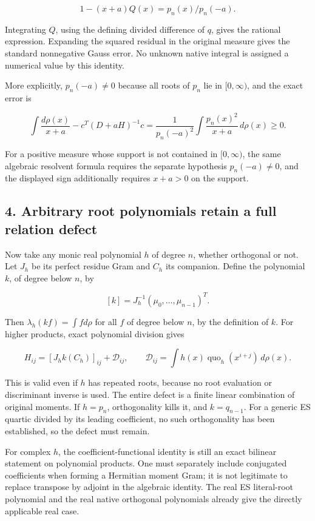 \[
 1-(x+a)Q(x)=p_n(x)/p_n(-a).
\]

Integrating \(Q\), using the defining divided difference of \(q\), gives
the rational expression. Expanding the squared residual in the original
measure gives the standard nonnegative Gauss error. No unknown native
integral is assigned a numerical value by this identity.

More explicitly, \(p_n(-a)\ne0\) because all roots of \(p_n\) lie in
\([0,\infty)\), and the exact error is

\[
 \boxed{
 \int\frac{d\rho(x)}{x+a}
 -c^T(D+aH)^{-1}c
 =\frac1{p_n(-a)^2}\int\frac{p_n(x)^2}{x+a}\,d\rho(x)\ge0.}
\]

For a positive measure whose support is not contained in \([0,\infty)\),
the same algebraic resolvent formula requires the separate hypothesis
\(p_n(-a)\ne0\), and the displayed sign additionally requires \(x+a>0\)
on the support.

\subsection{4. Arbitrary root polynomials retain a full relation
defect}\label{arbitrary-root-polynomials-retain-a-full-relation-defect}

Now take any monic real polynomial \(h\) of degree \(n\), whether
orthogonal or not. Let \(J_h\) be its perfect residue Gram and \(C_h\)
its companion. Define the polynomial \(k\), of degree below \(n\), by

\[
 [k]=J_h^{-1}(\mu_0,\ldots,\mu_{n-1})^T.
\]

Then \(\lambda_h(kf)=\int f d\rho\) for all \(f\) of degree below \(n\),
by the definition of \(k\). For higher products, exact polynomial
division gives

\[
 \boxed{H_{ij}=[J_h k(C_h)]_{ij}+\mathcal D_{ij},\qquad
 \mathcal D_{ij}=\int h(x)\operatorname{quo}_h(x^{i+j})\,d\rho(x).}
\]

This is valid even if \(h\) has repeated roots, because no root
evaluation or discriminant inverse is used. The entire defect is a
finite linear combination of original moments. If \(h=p_n\),
orthogonality kills it, and \(k=q_{n-1}\). For a generic ES quartic
divided by its leading coefficient, no such orthogonality has been
established, so the defect must remain.

For complex \(h\), the coefficient-functional identity is still an exact
bilinear statement on polynomial products. One must separately include
conjugated coefficients when forming a Hermitian moment Gram; it is not
legitimate to replace transpose by adjoint in the algebraic identity.
The real ES literal-root polynomial and the real native orthogonal
polynomials already give the directly applicable real case.

